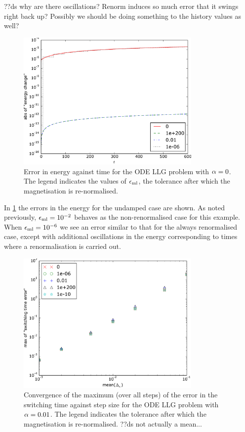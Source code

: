??ds why are there oscillations? Renorm induces so much error that it swings right back up? Possibly we should be doing something to the history values as well?

\begin{figure}
  \centering
  \includegraphics[width=0.8\textwidth]{plots/tolrenorm-geom-properties/0-absofenergychangevstimes.pdf}
  \caption{
    Error in energy against time
    for the ODE LLG problem
    with $\alpha = 0$.
    The legend indicates the values of $\epsilon_{\mathrm{ml}}$, the tolerance after which the magnetisation is re-normalised.
  }
  \label{fig:renorm-tol-energy-err}
\end{figure}

In \cref{fig:renorm-tol-energy-err} the errors in the energy for the undamped case are shown.
As noted previously, $\epsilon_{\mathrm{ml}}= 10^{-2}$ behaves as the non-renormalised case for this example.
When $\epsilon_{\mathrm{ml}} = 10^{-6}$ we see an error similar to that for the always renormalised case, except with additional oscillations in the energy corresponding to times where a renormalisation is carried out.


\begin{figure}
  \centering
  \includegraphics[width=0.8\textwidth]{plots/tolrenorm_llg_ode_convergence/maxofswitchingtimeerrorvsmeanofdts}
  \caption{
    Convergence of the maximum (over all steps) of the error in the switching time
    against step size
    for the ODE LLG problem with
    $\alpha = 0.01$.
    The legend indicates the tolerance after which the magnetisation is re-normalised.
    ??ds not actually a mean...
  }
  \label{fig:tol-renorm-convergence}
\end{figure}

